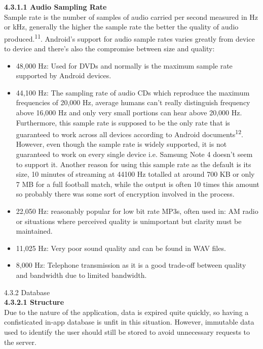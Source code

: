 \documentclass{article}
\begin{document}
\begin{flushleft}
\begin{itemize}
\end{itemize} 
\textbf {4.3.1.1 Audio Sampling Rate}\\
Sample rate is the number of samples of audio carried per second measured in Hz or kHz, generally the higher the sample rate the better the quality of audio produced.\textsuperscript{11}. Android's support for audio sample rates varies greatly from device to device and there's also the compromise between size and quality:\\
\begin{itemize}
	\item 48,000 Hz: Used for DVDs and normally is the maximum sample rate supported by Android devices.\\
	\item 44,100 Hz: The sampling rate of audio CDs which reproduce the maximum frequencies of 20,000 Hz, average humans can't really distinguish frequency above 16,000 Hz and only very small portions can hear above 20,000 Hz. Furthermore, this sample rate is supposed to be the only rate that is guaranteed to work across all devices according to Android documents\textsuperscript{12}. However, even though the sample rate is widely supported, it is not guaranteed to work on every single device i.e. Samsung Note 4 doesn't seem to support it. Another reason for using this sample rate as the default is its size, 10 minutes of streaming at 44100 Hz totalled at around 700 KB or only 7 MB for a full football match, while the output is often 10 times this amount so probably there was some sort of encryption involved in the process.\\
	\item 22,050 Hz: reasonably popular for low bit rate MP3s,  often used in: AM radio or situations where perceived quality is unimportant but clarity must be maintained.
	\item 11,025 Hz: Very poor sound quality and can be found in WAV files.
	\item 8,000 Hz: Telephone transmission as it is a good trade-off between quality and bandwidth due to limited bandwidth.
\end{itemize}
{\large 4.3.2 Database}\\
{\textbf {4.3.2.1 Structure}}\\
Due to the nature of the application, data is expired quite quickly, so having a confisticated in-app database is unfit in this situation. However, immutable data used to identify the user should still be stored to avoid unnecessary requests to the server.\\

\end{flushleft}
\end{document}

